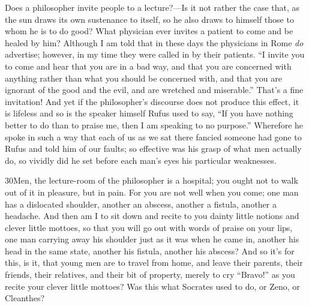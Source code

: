 Does a philosopher invite people to a lecture?—Is it not rather the case that, as the sun draws its own sustenance to itself, so he also draws to himself those to whom he is to do good? What physician ever invites a patient to come and be healed by him? Although I am told that in these days the physicians in Rome \emph{do} advertise; however, in my time they were called in by their patients. ``I invite you to come and hear that you are in a bad way, and that you are concerned with anything rather than what you should be concerned with, and that you are ignorant of the good and the evil, and are wretched and miserable.'' That's a fine invitation! And yet if the philosopher's discourse does not produce this effect, it is lifeless and so is the speaker himself Rufus used to say, ``If you have nothing better to do than to praise me, then I am speaking to no purpose.'' Wherefore he spoke in such a way that each of us as we sat there fancied someone had gone to Rufus and told him of our faults; so effective was his grasp of what men actually do, so vividly did he set before each man's eyes his particular weaknesses.

30Men, the lecture-room of the philosopher is a hospital; you ought not to walk out of it in pleasure, but in pain. For you are not well when you come; one man has a dislocated shoulder, another an abscess, another a fistula, another a headache. And then am I to sit down and recite to you dainty little notions and clever little mottoes, so that you will go out with words of praise on your lips, one man carrying away his shoulder just as it was when he came in, another his head in the same state, another his fistula, another his abscess? And so it's for this, is it, that young men are to travel from home, and leave their parents, their friends, their relatives, and their bit of property, merely to cry ``Bravo!'' as you recite your clever little mottoes? Was this what Socrates used to do, or Zeno, or Cleanthes?

